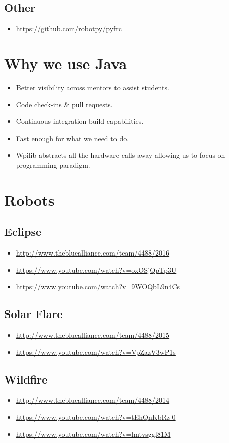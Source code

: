 \documentclass{article}
\begin{document}
\subsection{Other}
\begin{itemize}
\item[] \url{https://github.com/robotpy/pyfrc}
\end{itemize}

\section{Why we use Java}
\begin{itemize}
    \item Better visibility across mentors to assist students.
    \item Code check-ins \& pull requests.
    \item Continuous integration build capabilities.
    \item Fast enough for what we need to do.
    \item Wpilib abstracts all the hardware calls away allowing us to focus on programming paradigm.
\end{itemize}

\pagebreak
\section{Robots}
\subsection{Eclipse}
\begin{itemize}
\item[] \url{http://www.thebluealliance.com/team/4488/2016}
\item[] \url{https://www.youtube.com/watch?v=oxOSjQpTp3U}
\item[] \url{https://www.youtube.com/watch?v=9WOQbL9n4Cs}
\end{itemize}
\subsection{Solar Flare}
\begin{itemize}
\item[] \url{http://www.thebluealliance.com/team/4488/2015}
\item[] \url{https://www.youtube.com/watch?v=VpZazV3wP1s}
\end{itemize}
\subsection{Wildfire}
\begin{itemize}
\item[] \url{http://www.thebluealliance.com/team/4488/2014}
\item[] \url{https://www.youtube.com/watch?v=tEhQnKbRz-0}
\item[] \url{https://www.youtube.com/watch?v=lmtvsggl81M}
\end{itemize}
\end{document}
